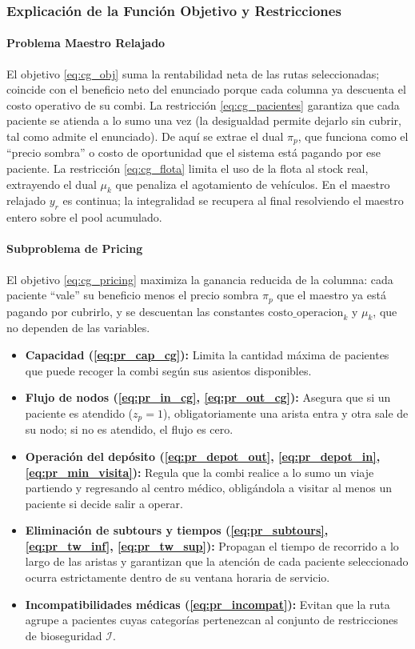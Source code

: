 \documentclass[12pt]{article}
\numberwithin{algorithm}{section}
\begin{document}
\subsubsection{Explicación de la Función Objetivo y Restricciones}

\paragraph{Problema Maestro Relajado}

El objetivo \eqref{eq:cg_obj} suma la rentabilidad neta de las rutas seleccionadas; coincide con el beneficio neto del enunciado porque cada columna ya descuenta el costo operativo de su combi. La restricción \eqref{eq:cg_pacientes} garantiza que cada paciente se atienda a lo sumo una vez (la desigualdad permite dejarlo sin cubrir, tal como admite el enunciado). De aquí se extrae el dual $\pi_p$, que funciona como el ``precio sombra'' o costo de oportunidad que el sistema está pagando por ese paciente. La restricción \eqref{eq:cg_flota} limita el uso de la flota al stock real, extrayendo el dual $\mu_k$ que penaliza el agotamiento de vehículos. En el maestro relajado $y_r$ es continua; la integralidad se recupera al final resolviendo el maestro entero sobre el pool acumulado.

\paragraph{Subproblema de Pricing}

El objetivo \eqref{eq:cg_pricing} maximiza la ganancia reducida de la columna: cada paciente ``vale'' su beneficio menos el precio sombra $\pi_p$ que el maestro ya está pagando por cubrirlo, y se descuentan las constantes $\text{costo\_operacion}_k$ y $\mu_k$, que no dependen de las variables.
\begin{itemize}
    \item \textbf{Capacidad (\eqref{eq:pr_cap_cg}):} Limita la cantidad máxima de pacientes que puede recoger la combi según sus asientos disponibles.
    \item \textbf{Flujo de nodos (\eqref{eq:pr_in_cg}, \eqref{eq:pr_out_cg}):} Asegura que si un paciente es atendido ($z_p = 1$), obligatoriamente una arista entra y otra sale de su nodo; si no es atendido, el flujo es cero.
    \item \textbf{Operación del depósito (\eqref{eq:pr_depot_out}, \eqref{eq:pr_depot_in}, \eqref{eq:pr_min_visita}):} Regula que la combi realice a lo sumo un viaje partiendo y regresando al centro médico, obligándola a visitar al menos un paciente si decide salir a operar.
    \item \textbf{Eliminación de subtours y tiempos (\eqref{eq:pr_subtours}, \eqref{eq:pr_tw_inf}, \eqref{eq:pr_tw_sup}):} Propagan el tiempo de recorrido a lo largo de las aristas y garantizan que la atención de cada paciente seleccionado ocurra estrictamente dentro de su ventana horaria de servicio.
    \item \textbf{Incompatibilidades médicas (\eqref{eq:pr_incompat}):} Evitan que la ruta agrupe a pacientes cuyas categorías pertenezcan al conjunto de restricciones de bioseguridad $\mathcal{I}$.
\end{itemize}
\end{document}
